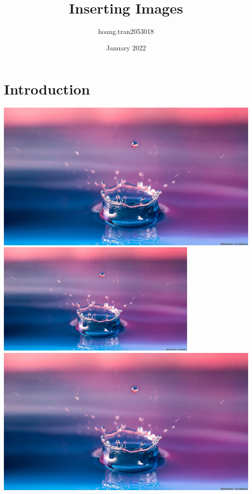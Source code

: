\documentclass{article}
\title{Inserting Images}
\author{hoang.tran2053018 }
\date{January 2022}
\begin{document}
\maketitle
\listoffigures
\listoftables


\section{Introduction}

\includegraphics[scale=0.16]{img1.jpg} \newline
\includegraphics[width=10cm]{img1.jpg} \newline
\includegraphics[width=\textwidth]{img1.jpg} \newline
\end{document}
